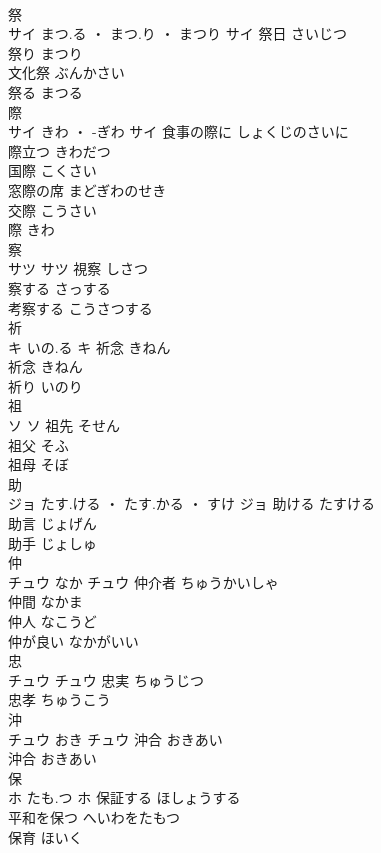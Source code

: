 \documentclass[8pt]{extreport}
\begin{document}
\begin{CJK}{UTF8}{min}
\\	祭	
\\	サイ	まつ.る ・ まつ.り ・ まつり	サイ	祭日	さいじつ	
\\	祭り	まつり	
\\	文化祭	ぶんかさい	
\\	祭る	まつる	
\\	際	
\\	サイ	きわ ・ -ぎわ	サイ	食事の際に	しょくじのさいに	
\\	際立つ	きわだつ	
\\	国際	こくさい	
\\	窓際の席	まどぎわのせき	
\\	交際	こうさい	
\\	際	きわ	
\\	察	
\\	サツ		サツ	視察	しさつ	
\\	察する	さっする	
\\	考察する	こうさつする	
\\	祈	
\\	キ	いの.る	キ	祈念	きねん	
\\	祈念	きねん	
\\	祈り	いのり	
\\	祖	
\\	ソ		ソ	祖先	そせん	
\\	祖父	そふ	
\\	祖母	そぼ	
\\	助	
\\	ジョ	たす.ける ・ たす.かる ・ すけ	ジョ	助ける	たすける	
\\	助言	じょげん	
\\	助手	じょしゅ	
\\	仲	
\\	チュウ	なか	チュウ	仲介者	ちゅうかいしゃ	
\\	仲間	なかま	
\\	仲人	なこうど	
\\	仲が良い	なかがいい	
\\	忠	
\\	チュウ		チュウ	忠実	ちゅうじつ	
\\	忠孝	ちゅうこう	
\\	沖	
\\	チュウ	おき	チュウ	沖合	おきあい	
\\	沖合	おきあい	
\\	保	
\\	ホ	たも.つ	ホ	保証する	ほしょうする	
\\	平和を保つ	へいわをたもつ	
\\	保育	ほいく	

\end{CJK}
\end{document}
